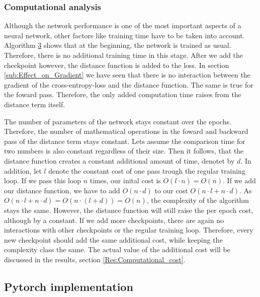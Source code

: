 \pagebreak
\subsubsection{Computational analysis}\label{sub:Computational_Analysis}
Although the network performance is one of the most important aspects of a
neural network, other factors like training time have to be taken into account.
Algorithm \hyperlink{alg:Distancing}{3} shows that at the beginning, the network is
trained as usual. Therefore, there is no additional training time in this stage.
After we add the checkpoint however, the distance function is added to the loss.
In section \ref{sub:Effect_on_Gradient} we have seen that there is no
interaction between the gradient of the cross-entropy-loss and the distance
function. The same is true for the foward pass. Therefore, the only added
computation time raises from the distance term itself.

The number of parameters of the network stays constant over the epochs.
Therefore, the number of mathematical operations in the foward and backward pass
of the distance term stays constant. Lets assume the comparison time for two
numbers is also constant regardless of their size. Then it follows, that the
distance function creates a constant additional amount of time, denotet by $d$.
In addition, let $l$ denote the constant cost of one pass trough the regular
training loop. If we pass this loop $n$ times, our inital cost is $O(l\cdot
n)=O(n)$. If we add our distance function, we have to add $O(n\cdot d)$ to our
cost $O(n\cdot l + n \cdot d)$. As $O(n\cdot l + n \cdot d)=O(n\cdot (l +
d))=O(n)$, the complexity of the algorithm stays the same. However, the distance
function will still raise the per epoch cost, although by a constant. If we add
more checkpoints, there are again no interactions with other checkpoints or the
regular training loop. Therefore, every new checkpoint should add the same
additional cost, while keeping the complexity class the same. The actual value
of the additional cost will be discussed in the results, section
\ref{Res:Computational_cost}.


\subsection{Pytorch implementation}\label{sub:Implementation}

